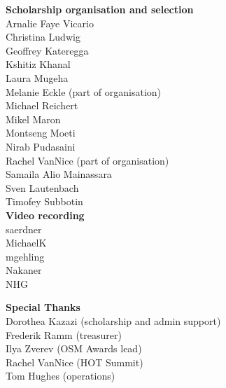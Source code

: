 \begin{multicols}{2}
\begin{small}
    \vspace{\volunteerSpace}
    \textbf{Scholarship organisation and selection}\\
    Arnalie Faye Vicario\\
    Christina Ludwig\\
    Geoffrey Kateregga\\
    Kshitiz Khanal\\
    Laura Mugeha\\
    Melanie Eckle (part of organisation)\\
    Michael Reichert\\
    Mikel Maron\\
    Montseng Moeti\\
    Nirab Pudasaini\\
    Rachel VanNice (part of organisation)\\
    Samaila Alio Mainassara\\
    Sven Lautenbach\\
    Timofey Subbotin\\

    \vspace{\volunteerSpace}
    \textbf{Video recording}\\
    saerdner\\
    MichaelK\\
    mgehling\\
    Nakaner\\
    NHG

    \vspace{\volunteerSpace}
    \textbf{Special Thanks}\\
    Dorothea Kazazi (scholarship and admin support)\\
    Frederik Ramm (treasurer)\\
    Ilya Zverev (OSM Awards lead)\\
    Rachel VanNice (HOT Summit)\\
    Tom Hughes (operations)\\
  \end{small}
\end{multicols}


